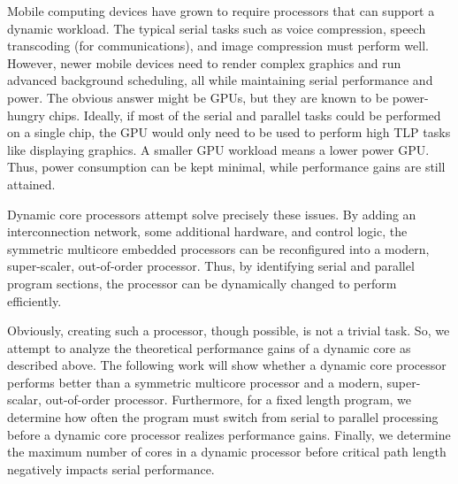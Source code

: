 Mobile computing devices have grown to require processors that can support a dynamic workload. The typical serial tasks such as voice compression, speech transcoding (for communications), and image compression must perform well. However, newer mobile devices need to render complex graphics and run advanced background scheduling, all while maintaining serial performance and power. The obvious answer might be GPUs, but they are known to be power-hungry chips. Ideally, if most of the serial and parallel tasks could be performed on a single chip, the GPU would only need to be used to perform high TLP tasks like displaying graphics. A smaller GPU workload means a lower power GPU. Thus, power consumption can be kept minimal, while performance gains are still attained.

Dynamic core processors attempt solve precisely these issues. By adding an interconnection network, some additional hardware, and control logic, the symmetric multicore embedded processors can be reconfigured into a modern, super-scaler, out-of-order processor. Thus, by identifying serial and parallel program sections, the processor can be dynamically changed to perform efficiently.

Obviously, creating such a processor, though possible, is not a trivial task. So, we attempt to analyze the theoretical performance gains of a dynamic core as described above. The following work will show whether a dynamic core processor performs better than a symmetric multicore processor and a modern, super-scalar, out-of-order processor. Furthermore, for a fixed length program, we determine how often the program must switch from serial to parallel processing before a dynamic core processor realizes performance gains. Finally, we determine the maximum number of cores in a dynamic processor before critical path length negatively impacts serial performance.